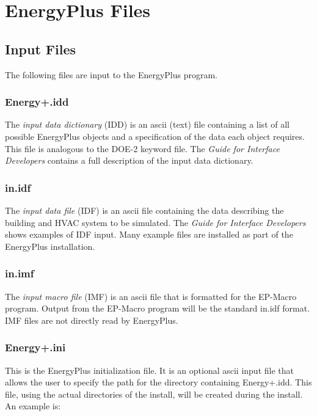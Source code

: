 \section{EnergyPlus Files}\label{energyplus-files}

\subsection{Input Files}\label{input-files-000}

The following files are input to the EnergyPlus program.

\subsubsection{Energy+.idd}\label{energy.idd}

The \emph{input data dictionary} (IDD) is an ascii (text) file containing a list of all possible EnergyPlus objects and a specification of the data each object requires. This file is analogous to the DOE-2 keyword file. The \emph{Guide for Interface Developers} contains a full description of the input data dictionary.

\subsubsection{in.idf}\label{in.idf}

The \emph{input data file} (IDF) is an ascii file containing the data describing the building and HVAC system to be simulated. The \emph{Guide for Interface Developers} shows examples of IDF input. Many example files are installed as part of the EnergyPlus installation.

\subsubsection{in.imf}\label{in.imf}

The \emph{input macro file} (IMF) is an ascii file that is formatted for the EP-Macro program. Output from the EP-Macro program will be the standard in.idf format. IMF files are not directly read by EnergyPlus.

\subsubsection{Energy+.ini}\label{energy.ini}

This is the EnergyPlus initialization file. It is an optional ascii input file that allows the user to specify the path for the directory containing Energy+.idd. This file, using the actual directories of the install, will be created during the install. An example is:

